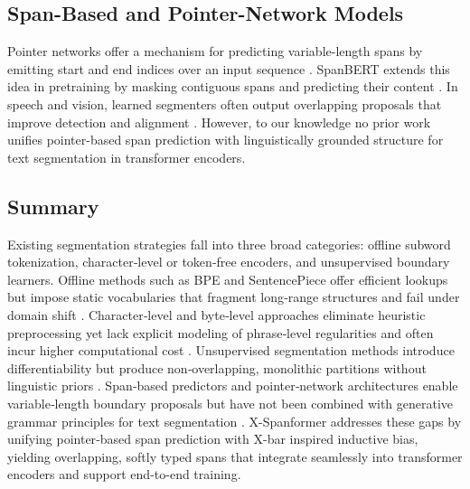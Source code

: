 \subsection{Span-Based and Pointer-Network Models}
Pointer networks offer a mechanism for predicting variable-length spans by emitting start and end indices over an input sequence \cite{vinyals2015pointer}. SpanBERT extends this idea in pretraining by masking contiguous spans and predicting their content \cite{joshi2020spanbert}. In speech and vision, learned segmenters often output overlapping proposals that improve detection and alignment \cite{ren2015faster, zach2019segmenter}. However, to our knowledge no prior work unifies pointer-based span prediction with linguistically grounded structure for text segmentation in transformer encoders.

\subsection{Summary}

Existing segmentation strategies fall into three broad categories: offline subword tokenization, character‐level or token‐free encoders, and unsupervised boundary learners. Offline methods such as BPE and SentencePiece offer efficient lookups but impose static vocabularies that fragment long‐range structures and fail under domain shift \cite{sennrich2016bpe, kudo2018sentencepiece, galle2021respite}. Character‐level and byte‐level approaches eliminate heuristic preprocessing yet lack explicit modeling of phrase‐level regularities and often incur higher computational cost \cite{taylor2021charformer, clark2021canine}. Unsupervised segmentation methods introduce differentiability but produce non‐overlapping, monolithic partitions without linguistic priors \cite{creutz2005unsupervised, liu2022learnedsegmentation, liu2022pmlm}. Span‐based predictors and pointer‐network architectures enable variable‐length boundary proposals but have not been combined with generative grammar principles for text segmentation \cite{vinyals2015pointer, joshi2020spanbert}. X-Spanformer addresses these gaps by unifying pointer‐based span prediction with X-bar inspired inductive bias, yielding overlapping, softly typed spans that integrate seamlessly into transformer encoders and support end-to-end training.  